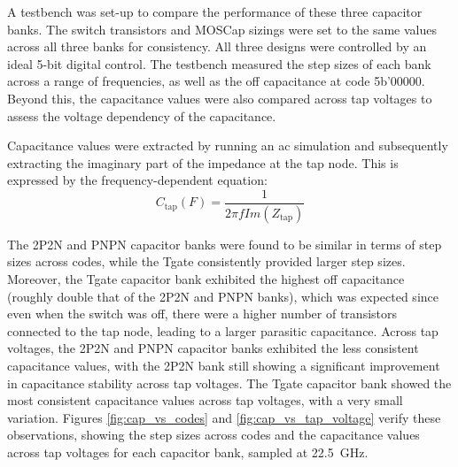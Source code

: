 A testbench was set-up to compare the performance of these three capacitor banks. The switch transistors and MOSCap sizings were set to the same values across all three banks for consistency. All three designs were controlled by an ideal 5-bit digital control. The testbench measured the step sizes of each bank across a range of frequencies, as well as the off capacitance at code 5b'00000. Beyond this, the capacitance values were also compared across tap voltages to assess the voltage dependency of the capacitance.

Capacitance values were extracted by running an ac simulation and subsequently extracting the imaginary part of the impedance at the tap node. This is expressed by the frequency-dependent equation:
\begin{equation}
  C_{\text{tap}}(F) = \frac{1}{2\pi f \textit{Im}(Z_{\text{tap}})}
\end{equation}

The 2P2N and PNPN capacitor banks were found to be similar in terms of step sizes across codes, while the Tgate consistently provided larger step sizes. Moreover, the Tgate capacitor bank exhibited the highest off capacitance (roughly double that of the 2P2N and PNPN banks), which was expected since even when the switch was off, there were a higher number of transistors connected to the tap node, leading to a larger parasitic capacitance.
Across tap voltages, the 2P2N and PNPN capacitor banks exhibited the less consistent capacitance values, with the 2P2N bank still showing a significant improvement in capacitance stability across tap voltages. The Tgate capacitor bank showed the most consistent capacitance values across tap voltages, with a very small variation.
Figures \ref{fig:cap_vs_codes} and \ref{fig:cap_vs_tap_voltage} verify these observations, showing the step sizes across codes and the capacitance values across tap voltages for each capacitor bank, sampled at 22.5~GHz.

